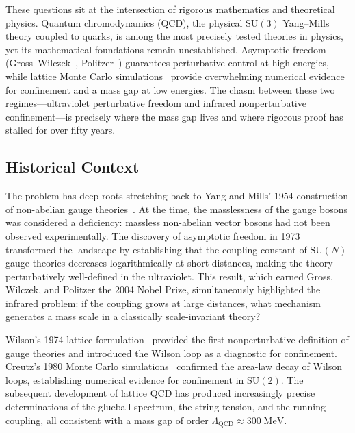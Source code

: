\documentclass[11pt]{article}
\begin{document}
These questions sit at the intersection of rigorous mathematics and
theoretical physics.  Quantum chromodynamics (QCD), the physical
$\mathrm{SU}(3)$ Yang--Mills theory coupled to quarks, is among the
most precisely tested theories in physics, yet its mathematical
foundations remain unestablished.  Asymptotic freedom
(Gross--Wilczek~\cite{GW}, Politzer~\cite{Pol}) guarantees
perturbative control at high energies, while lattice Monte Carlo
simulations~\cite{Creutz} provide overwhelming numerical evidence for
confinement and a mass gap at low energies.  The chasm between these
two regimes---ultraviolet perturbative freedom and infrared
nonperturbative confinement---is precisely where the mass gap lives
and where rigorous proof has stalled for over fifty years.

\subsection*{Historical Context}

The problem has deep roots stretching back to Yang and Mills' 1954
construction of non-abelian gauge theories~\cite{YangMills}.  At the time,
the masslessness of the gauge bosons was considered a deficiency: massless
non-abelian vector bosons had not been observed experimentally.  The
discovery of asymptotic freedom in 1973~\cite{GW,Pol} transformed the
landscape by establishing that the coupling constant of $\mathrm{SU}(N)$
gauge theories decreases logarithmically at short distances, making the
theory perturbatively well-defined in the ultraviolet.  This result, which
earned Gross, Wilczek, and Politzer the 2004 Nobel Prize, simultaneously
highlighted the infrared problem: if the coupling grows at large distances,
what mechanism generates a mass scale in a classically scale-invariant theory?

Wilson's 1974 lattice formulation~\cite{Wilson} provided the first
nonperturbative definition of gauge theories and introduced the Wilson
loop as a diagnostic for confinement.  Creutz's 1980 Monte Carlo
simulations~\cite{Creutz} confirmed the area-law decay of Wilson loops,
establishing numerical evidence for confinement in $\mathrm{SU}(2)$.
The subsequent development of lattice QCD has produced increasingly precise
determinations of the glueball spectrum, the string tension, and the running
coupling, all consistent with a mass gap of order
$\Lambda_{\mathrm{QCD}} \approx 300\;\mathrm{MeV}$.
\end{document}

